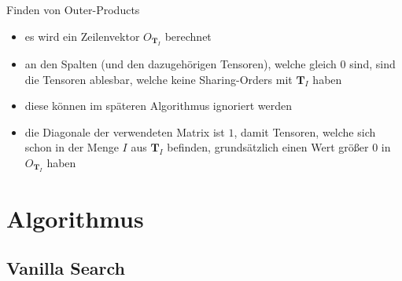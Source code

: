 \documentclass{beamer}
\begin{document}
\begin{frame}{Finden von Outer-Products}
	\begin{itemize}
		\item es wird ein Zeilenvektor $O_{\bm{T}_I}$ berechnet
		\item an den Spalten (und den dazugehörigen Tensoren), welche gleich $0$ sind, sind die Tensoren ablesbar, welche keine Sharing-Orders mit $\bm{T}_I$ haben
		\item diese können im späteren Algorithmus ignoriert werden \pause
		\item die Diagonale der verwendeten Matrix ist $1$, damit Tensoren, welche sich schon in der Menge $I$ aus $\bm{T}_I$ befinden, grundsätzlich einen Wert größer $0$ in $O_{\bm{T}_I}$ haben
	\end{itemize}
\end{frame}



\section{Algorithmus}



\subsection{Vanilla Search}
\end{document}
